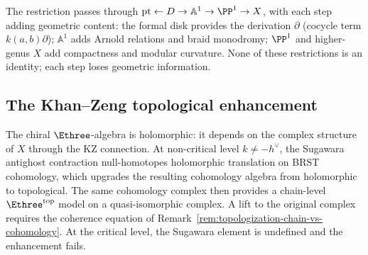 \begin{remark}
\label{rem:disk-vs-point}
The restriction passes through
$\mathrm{pt} \leftarrow D \to \mathbb{A}^1 \to \PP^1
\to X$, with each step adding geometric content: the formal
disk provides the derivation $\partial$ (cocycle term
$k(a,b)\partial$); $\mathbb{A}^1$ adds Arnold relations
and braid monodromy; $\PP^1$ and higher-genus $X$ add
compactness and modular curvature. None of these
restrictions is an identity; each step loses geometric
information.
\end{remark}


\subsection{The Khan--Zeng topological enhancement}
\label{subsec:khan-zeng-enhancement}

The chiral $\Ethree$-algebra is holomorphic: it depends on the
complex structure of $X$ through the KZ connection. At
non-critical level $k \neq -h^\vee$, the Sugawara antighost
contraction null-homotopes holomorphic translation on BRST cohomology,
which upgrades the resulting cohomology algebra from
holomorphic to topological. The same cohomology complex then
provides a chain-level $\Ethree^{\mathrm{top}}$ model on a
quasi-isomorphic complex. A lift to the original complex
requires the coherence equation of
Remark~\ref{rem:topologization-chain-vs-cohomology}. At the
critical level, the Sugawara element is undefined and the
enhancement fails.

